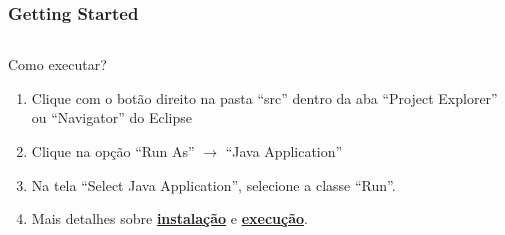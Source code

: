 \documentclass{beamer}
\begin{document}

\begin{frame}
\frametitle{Getting Started}



\begin{columns}[c] %

\begin{exampleblock}{Como executar?}
	\begin{enumerate}
		\item Clique com o botão direito na pasta “src” dentro da aba 
“Project Explorer” ou “Navigator” do Eclipse

		\item Clique na opção “Run As” $\rightarrow $ “Java Application”
		
		\item Na tela “Select Java Application”, selecione a classe “Run”.
		
		\item Mais detalhes sobre  \href{http://disco.ethz.ch/projects/sinalgo/tutorial/Installation.html}{\textbf{instalação}} 
		e 
\href{http://disco.ethz.ch/projects/sinalgo/tutorial/Execution.html}{\textbf{execução}}.
	\end{enumerate}
\end{exampleblock}



\end{columns}
\end{frame}
\end{document}
